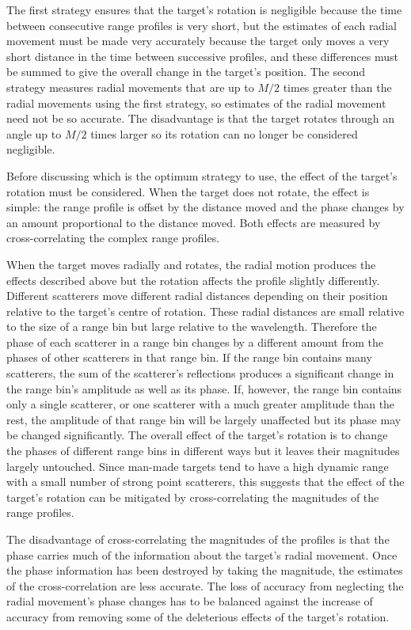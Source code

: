 The first strategy ensures that the target's rotation is negligible because
the time between consecutive range profiles is very short, but the estimates
of each radial movement must be made very accurately because the target only
moves a very short distance in the time between successive profiles, and
these differences must be summed to give the overall change in the target's
position.
The second strategy measures radial movements that are up to $M/2$ times
greater than the radial movements using the first strategy, so estimates
of the radial movement need not be so accurate.  The disadvantage is that
the target rotates through an angle up to $M/2$ times larger so its rotation
can no longer be considered negligible.

Before discussing which is the optimum strategy to use, the effect of the
target's rotation must be considered.  When the target does not rotate, the
effect is simple: the range profile is offset by the distance moved and the
phase changes by an amount proportional to the distance moved.  Both effects
are measured by cross-correlating the complex range profiles.

When the target moves radially and rotates, the radial motion produces the
effects described above but the rotation affects the profile slightly
differently.  Different scatterers move different radial distances
depending on their position relative to the target's centre of rotation. 
These radial distances are small relative to the size of a range bin but
large relative to the wavelength.  Therefore the phase of each scatterer in
a range bin changes by a different amount from the phases of other
scatterers in that range bin.  If the range bin contains many scatterers,
the sum of the scatterer's reflections produces a significant change in
the range bin's amplitude as well as its phase.  If, however, the range bin
contains only a single scatterer, or one scatterer with a much greater
amplitude than the rest, the amplitude of that range bin will be largely
unaffected but its phase may be changed significantly.  The overall effect
of the target's rotation is to change the phases of different range bins in
different ways but it leaves their magnitudes largely untouched.  Since
man-made targets tend to have a high dynamic range with a small number of
strong point scatterers, this suggests that the effect of the target's
rotation can be mitigated by cross-correlating the magnitudes of the range
profiles.

The disadvantage of cross-correlating the magnitudes of the profiles is
that the phase carries much of the information about the target's radial
movement.  Once the phase information has been destroyed by taking the
magnitude, the estimates of the cross-correlation are less accurate.  The
loss of accuracy from neglecting the radial movement's phase changes has to
be balanced against the increase of accuracy from removing some of the
deleterious effects of the target's rotation.

